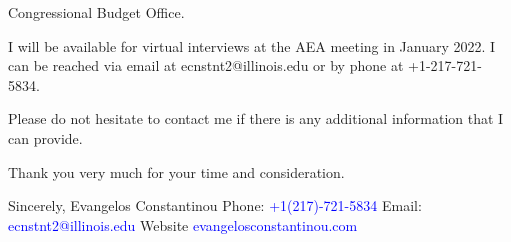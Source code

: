 \documentclass[12pt]{letter}
\begin{document}
\begin{letter}{Congressional Budget Office.}





I will be available for virtual interviews at the AEA meeting in January 2022.
I can be reached via email at ecnstnt2@illinois.edu or by phone at +1-217-721-5834.

Please do not hesitate to contact me if there is any additional information that I can provide.

Thank you very much for your time and consideration.


\noindent Sincerely,
\newline\noindent Evangelos Constantinou
\vspace{4mm}
\newline\noindent Phone: \textcolor{blue}{+1(217)-721-5834}
\newline\noindent Email: \textcolor{blue}{ecnstnt2@illinois.edu}
\newline\noindent Website \textcolor{blue}{evangelosconstantinou.com}
\end{letter}
\end{document}
